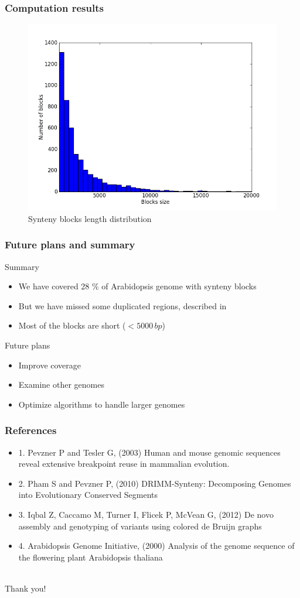 \documentclass[svgnames,14pt]{beamer}
\begin{document}
\begin{frame}
\frametitle{Computation results}
\begin{figure}
\centering
\includegraphics[scale = 0.480]{blocks_len_distrib.png}
\small \caption{Synteny blocks length distribution}
\end{figure}
\end{frame}

\begin{frame}
\frametitle{Future plans and summary}
Summary
\begin{itemize}
\item We have covered 28 \% of Arabidopsis genome with synteny blocks
\item But we have missed some duplicated regions, described in 
\item Most of the blocks are short (\(< 5000 \,  bp\))
\end{itemize}
Future plans
\begin{itemize}
\item Improve coverage
\item Examine other genomes
\item Optimize algorithms to handle larger genomes
\end{itemize}
\end{frame}

\begin{frame}
\frametitle{References}
\begin{itemize}
\item 1. Pevzner P and Tesler G, (2003) Human and mouse genomic sequences reveal extensive breakpoint reuse in mammalian evolution. 
\item 2. Pham S and Pevzner P, (2010) DRIMM-Synteny: Decomposing Genomes into Evolutionary Conserved Segments
\item 3. Iqbal Z, Caccamo M, Turner I, Flicek P, McVean G, (2012) De novo assembly and genotyping of variants using colored de Bruijn graphs
\item 4. Arabidopsis Genome Initiative, (2000) Analysis of the genome sequence of the flowering plant Arabidopsis thaliana
\end{itemize}
\end{frame}

\begin{center}
\hfill \huge \\
\vspace{60pt}
Thank you!
\end{center}
\end{document}
